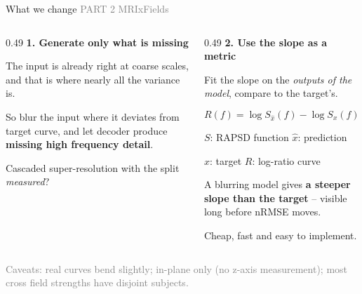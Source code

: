 \documentclass[aspectratio=169,11pt]{beamer}
\newcommand{\hl}[1]{\textcolor{accent}{\textbf{#1}}}
\newcommand{\parttag}[1]{{\scriptsize\textcolor{gray}{#1}}\par\vspace{0.3em}}
\newcommand{\gloss}[1]{{\footnotesize\textcolor{black!65}{#1}}\par}
\newcommand{\srcline}[1]{\vfill{\scriptsize\textcolor{gray}{#1}}}
\begin{document}
\begin{frame}{What we change}
  \parttag{PART 2 \quad MRIxFields}

  \begin{columns}[T,onlytextwidth]
  \begin{column}{0.49\textwidth}
    \textbf{1. Generate only what is missing}

    \vspace{0.5em}
    {\small The input is already right at coarse scales, and that is where nearly all the variance is.

    \vspace{0.6em}
    So blur the input where it deviates from target curve, and let decoder produce
    \hl{missing high frequency detail}.

    \vspace{0.6em}
    Cascaded super-resolution with the split \emph{measured}?}
  \end{column}

  \begin{column}{0.49\textwidth}
    \textbf{2. Use the slope as a metric}

    \vspace{0.5em}
    {
      \small Fit the slope on the \emph{outputs of the model}, compare to the target's.

      \vspace{0.2em}
      \[ R(f) = \log S_{\hat x}(f) - \log S_x(f) \]
      \par\vspace{0.1em}
      \gloss{$S$: RAPSD function \quad $\hat x$: prediction}
      \vspace{0.1em}
      \gloss{$x$: target \quad $R$: log-ratio curve}

      \vspace{0.6em}
      A blurring model gives \hl{a steeper slope than the target} -- visible long before nRMSE moves.

      \vspace{0.6em}
      Cheap, fast and easy to implement.
    }
  \end{column}
  \end{columns}

  \srcline{Caveats: real curves bend slightly; in-plane only (no z-axis measurement); most cross field strengths have
  disjoint subjects.}
\end{frame}
\end{document}

